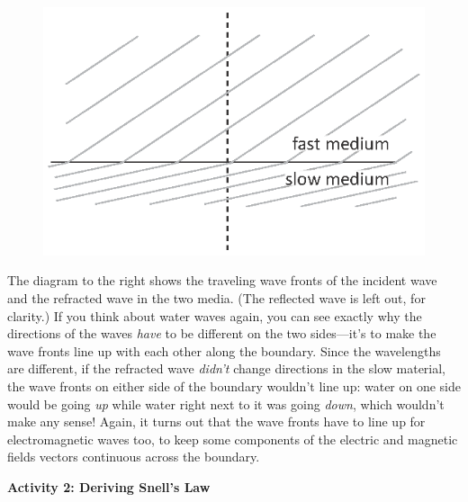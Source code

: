 \begin{figure}
\begin{flushright}
\vspace{-0.2in}
{\includegraphics{deriving_snells_law/wave_fronts.eps}}
\end{flushright}
\end{figure}

The diagram to the right shows the traveling wave fronts of the incident wave and the refracted wave in the two media.  (The reflected wave is left out, for clarity.)  If you think about water waves again, you can see exactly why the directions of the waves \textit{have} to be different on the two sides---it's to make the wave fronts line up with each other along the boundary.  Since the wavelengths are different, if the refracted wave \textit{didn't} change directions in the slow material, the wave fronts on either side of the boundary wouldn't line up: water on one side would be going \textit{up} while water right next to it was going \textit{down}, which wouldn't make any sense!  Again, it turns out that the wave fronts have to line up for electromagnetic waves too, to keep some components of the electric and magnetic fields vectors continuous across the boundary.

\bigskip
\textbf{Activity 2: Deriving Snell's Law}

